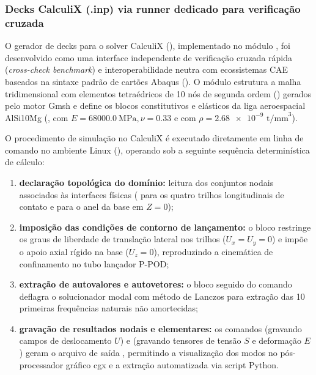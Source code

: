 \subsubsection{Decks CalculiX (.inp) via runner dedicado para verificação cruzada}
\label{subsubsec:calculix}
O gerador de decks para o solver CalculiX (), implementado no módulo , foi desenvolvido como uma interface independente de verificação cruzada rápida (\textit{cross-check benchmark}) e interoperabilidade neutra com ecossistemas CAE baseados na sintaxe padrão de cartões Abaqus (). O módulo estrutura a malha tridimensional com elementos tetraédricos de 10 nós de segunda ordem () gerados pelo motor Gmsh e define os blocos constitutivos e elásticos da liga aeroespacial AlSi10Mg (,  com $E = \SI{68000.0}{\mega\pascal}, \nu = \num{0.33}$ e  com $\rho = \num{2.68e-9}\text{ t/mm}^3$).

O procedimento de simulação no CalculiX é executado diretamente em linha de comando no ambiente Linux (), operando sob a seguinte sequência determinística de cálculo:
\begin{enumerate}
  \item \textbf{declaração topológica do domínio:} leitura dos conjuntos nodais associados às interfaces físicas ( para os quatro trilhos longitudinais de contato e  para o anel da base em $Z = 0$);
  \item \textbf{imposição das condições de contorno de lançamento:} o bloco  restringe os graus de liberdade de translação lateral nos trilhos ($U_x = U_y = 0$) e impõe o apoio axial rígido na base ($U_z = 0$), reproduzindo a cinemática de confinamento no tubo lançador P-POD;
  \item \textbf{extração de autovalores e autovetores:} o bloco  seguido do comando  deflagra o solucionador modal com método de Lanczos para extração das 10 primeiras frequências naturais não amortecidas;
  \item \textbf{gravação de resultados nodais e elementares:} os comandos  (gravando campos de deslocamento $U$) e  (gravando tensores de tensão $S$ e deformação $E$) geram o arquivo de saída , permitindo a visualização dos modos no pós-processador gráfico cgx e a extração automatizada via script Python.
\end{enumerate}

